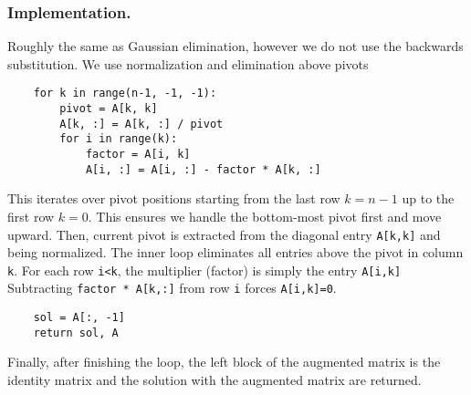 \documentclass[../../../main.tex]{subfiles}
\begin{document}
\subsubsection{Implementation.}
Roughly the same as Gaussian elimination, however we do not use the backwards substitution.
We use normalization and elimination above pivots
\begin{verbatim}
    for k in range(n-1, -1, -1):  
        pivot = A[k, k]
        A[k, :] = A[k, :] / pivot 
        for i in range(k):
            factor = A[i, k]
            A[i, :] = A[i, :] - factor * A[k, :]
\end{verbatim}
This iterates over pivot positions starting from the last row $k=n-1$ up to the first row $k=0$.
This ensures we handle the bottom-most pivot first and move upward.
Then, current pivot is extracted from the diagonal entry \verb|A[k,k]| and being normalized.
The inner loop eliminates all entries above the pivot in column \verb|k|.
For each row \verb|i<k|, the multiplier (factor) is simply the entry \verb|A[i,k]|
Subtracting \verb|factor * A[k,:]| from row \verb|i| forces \verb|A[i,k]=0|.
\begin{verbatim}
    sol = A[:, -1]
    return sol, A
\end{verbatim}
Finally, after finishing the loop, the left block of the augmented matrix is the identity matrix and the solution  with the augmented matrix are returned.
\end{document}

